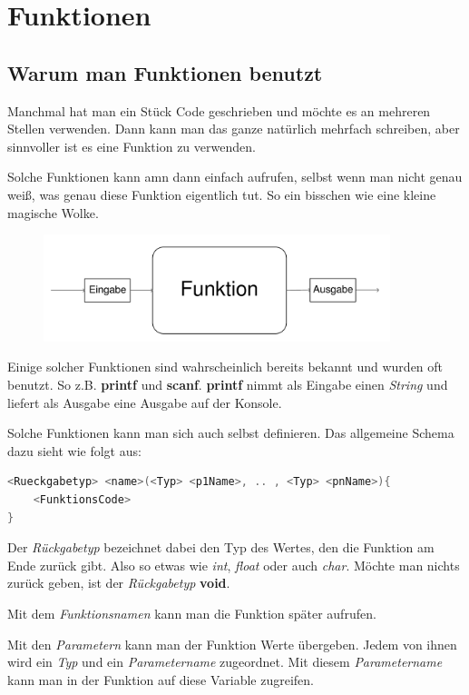 \documentclass[c_worksheet.tex]{subfiles}
\begin{document}
\chapter{Funktionen}


\section{Warum man Funktionen benutzt} 

Manchmal hat man ein Stück Code geschrieben und möchte es an mehreren Stellen verwenden. Dann kann man das ganze natürlich mehrfach schreiben, aber sinnvoller ist es eine Funktion zu verwenden.

Solche Funktionen kann amn dann einfach aufrufen, selbst wenn man nicht genau weiß, was genau diese Funktion eigentlich tut. So ein bisschen wie eine kleine magische Wolke.

\begin{figure}[h]
\center
\includegraphics[width=0.9\textwidth]{Grafiken/Funktionen/function}
\end{figure}

Einige solcher Funktionen sind wahrscheinlich bereits bekannt und wurden oft benutzt. So z.B. \textbf{printf} und \textbf{scanf}. \textbf{printf} nimmt als Eingabe einen \emph{String} und liefert als Ausgabe eine Ausgabe auf der Konsole.

Solche Funktionen kann man sich auch selbst definieren. Das allgemeine Schema dazu sieht wie folgt aus:

\begin{lstlisting}[language=c]
<Rueckgabetyp> <name>(<Typ> <p1Name>, .. , <Typ> <pnName>){
	<FunktionsCode>
}
\end{lstlisting}

Der \emph{Rückgabetyp} bezeichnet dabei den Typ des Wertes, den die Funktion am Ende zurück gibt. Also so etwas wie \emph{int}, \emph{float} oder auch \emph{char}. Möchte man nichts zurück geben, ist der \emph{Rückgabetyp} \textbf{void}.

Mit dem \emph{Funktionsnamen} kann man die Funktion später aufrufen.

Mit den \emph{Parametern} kann man der Funktion Werte übergeben. Jedem von ihnen wird ein \emph{Typ} und ein \emph{Parametername} zugeordnet. Mit diesem \emph{Parametername} kann man in der Funktion auf diese Variable zugreifen.
\end{document}
